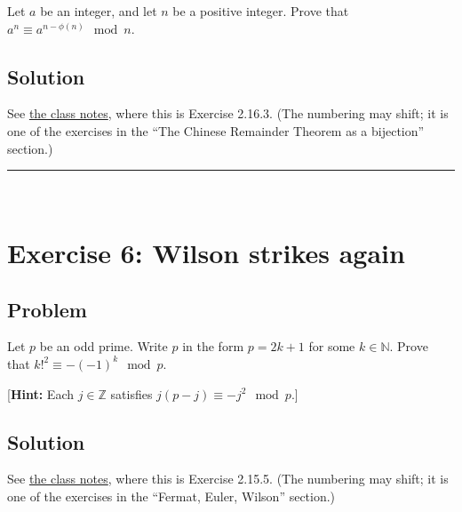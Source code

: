 \documentclass[paper=a4, fontsize=12pt]{scrartcl}%
\theoremstyle{plainsl}
\theoremstyle{definition}
\theoremstyle{remark}
\begin{document}
Let $a$ be an integer, and let $n$ be a positive integer. Prove that $a^{n}
\equiv a^{n - \phi\left(  n \right)  } \mod n$.

\subsection{Solution}

See \href{http://www-users.math.umn.edu/~dgrinber/19s/notes.pdf}{the class
notes}, where this is Exercise 2.16.3. (The numbering may shift; it is one of
the exercises in the ``The Chinese Remainder Theorem as a bijection'' section.)



\rule{\linewidth}{0.3pt} \\[0.4cm]

\section{Exercise 6: Wilson strikes again}

\subsection{Problem}

Let $p$ be an odd prime. Write $p$ in the form $p = 2k+1$ for some $k
\in\mathbb{N}$. Prove that $k!^{2} \equiv- \left(  -1 \right)  ^{k} \mod p$.

[\textbf{Hint:} Each $j \in\mathbb{Z}$ satisfies $j \left(  p-j \right)
\equiv-j^{2} \mod p$.]

\subsection{Solution}

See \href{http://www-users.math.umn.edu/~dgrinber/19s/notes.pdf}{the class
notes}, where this is Exercise 2.15.5. (The numbering may shift; it is one of
the exercises in the ``Fermat, Euler, Wilson'' section.)
\end{document}
